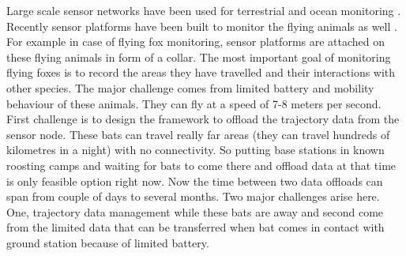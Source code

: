 \documentclass[conference]{IEEEtran}
\begin{document}
Large scale sensor networks have been used for terrestrial \cite{robo-mote} and ocean monitoring \cite{Vasilescu05krill:an}. Recently sensor platforms have been built to monitor the flying animals as well \cite{Anthony:2012:STC:2185677.2185747} \cite{raja-ipsn}. For example in case of flying fox monitoring, sensor platforms are attached on these flying animals in form of a collar\cite{raja-ipsn}. The most important goal of monitoring flying foxes is to record the areas they have travelled and their interactions with other species\cite{raja-ipsn}. The major challenge comes from limited battery and mobility behaviour of these animals. They can fly at a speed of 7-8 meters per second. First challenge is to design the framework to offload the trajectory data from the sensor node. These bats can travel really far areas (they can travel hundreds of kilometres in a night) with no connectivity. So putting base stations in known roosting camps and waiting for bats to come there and offload data at that time is only feasible option right now\cite{raja-ipsn}. Now the time between two data offloads can span from couple of days to several months. Two major challenges arise here. One, trajectory data management while these bats are away and second come from the limited data that can be transferred when bat comes in contact with ground station because of limited battery.
%
%
\end{document}
